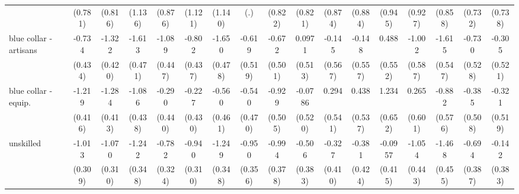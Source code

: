 {\begin{tabular}{l*{16}{c}}
                    &     (0.781)         &     (0.816)         &     (1.136)         &     (0.876)         &     (1.121)         &     (1.140)         &         (.)         &     (0.822)         &     (0.821)         &     (0.874)         &     (0.884)         &     (0.945)         &     (0.927)         &     (0.858)         &     (0.732)         &     (0.738)         \\
[1em]
blue collar - artisans&      -0.734         &      -1.322\sym{**} &      -1.613\sym{***}&      -1.089\sym{*}  &      -0.802         &      -1.650\sym{***}&      -0.619         &      -0.672         &      0.0971         &      -0.145         &      -0.148         &       0.488         &      -1.002         &      -1.615\sym{**} &      -0.730         &      -0.305         \\
                    &     (0.434)         &     (0.420)         &     (0.471)         &     (0.447)         &     (0.437)         &     (0.478)         &     (0.519)         &     (0.501)         &     (0.513)         &     (0.567)         &     (0.557)         &     (0.552)         &     (0.587)         &     (0.547)         &     (0.528)         &     (0.521)         \\
[1em]
blue collar - equip.&      -1.219\sym{**} &      -1.284\sym{**} &      -1.086\sym{*}  &      -0.290         &      -0.227         &      -0.560         &      -0.540         &      -0.929         &     -0.0786         &       0.294         &       0.438         &       1.234         &       0.265         &      -0.882         &      -0.385         &      -0.321         \\
                    &     (0.416)         &     (0.413)         &     (0.438)         &     (0.440)         &     (0.430)         &     (0.461)         &     (0.470)         &     (0.505)         &     (0.520)         &     (0.541)         &     (0.537)         &     (0.652)         &     (0.601)         &     (0.576)         &     (0.508)         &     (0.519)         \\
[1em]
unskilled           &      -1.013\sym{**} &      -1.070\sym{***}&      -1.242\sym{***}&      -0.782\sym{*}  &      -0.940\sym{**} &      -1.249\sym{***}&      -0.950\sym{**} &      -0.994\sym{**} &      -0.506         &      -0.327         &      -0.381         &     -0.0957         &      -1.054\sym{*}  &      -1.468\sym{**} &      -0.694         &      -0.142         \\
                    &     (0.309)         &     (0.310)         &     (0.348)         &     (0.324)         &     (0.310)         &     (0.348)         &     (0.356)         &     (0.378)         &     (0.383)         &     (0.410)         &     (0.424)         &     (0.415)         &     (0.443)         &     (0.455)         &     (0.387)         &     (0.383)         \\

\end{tabular}}
